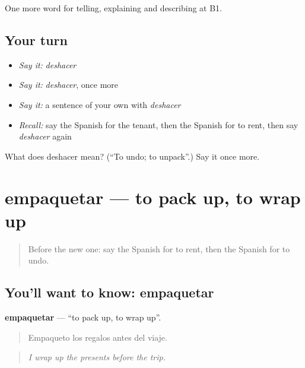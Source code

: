 \begin{grammarlens}[title={What you've built}]
One more word for telling, explaining and describing at B1.
\end{grammarlens}

\subsection*{Your turn}
\begin{itemize}
\raggedright
  \item \emph{Say it:} \emph{deshacer}
  \item \emph{Say it:} \emph{deshacer}, once more
  \item \emph{Say it:} a sentence of your own with \emph{deshacer}
  \item \emph{Recall:} say the Spanish for the tenant, then the Spanish for to rent, then say \emph{deshacer} again
\end{itemize}

\begin{tcolorbox}[breakable,colback=teal!4,colframe=teal!35!black,title={Before you move on}]
What does deshacer mean? (\textquotedblleft{}To undo; to unpack\textquotedblright{}.) Say it once more.
\end{tcolorbox}
\section[empaquetar]{empaquetar — to pack up, to wrap up}

\label{lesson:ES-C668-empaquetar}



\begin{quote}
Before the new one: say the Spanish for to rent, then the Spanish for to undo.
\end{quote}

\subsection*{You'll want to know: empaquetar}
\textbf{empaquetar} — \textquotedblleft{}to pack up, to wrap up\textquotedblright{}.

\begin{quote}
Empaqueto los regalos antes del viaje.
\end{quote}

\begin{quote}
\emph{I wrap up the presents before the trip.}
\end{quote}

